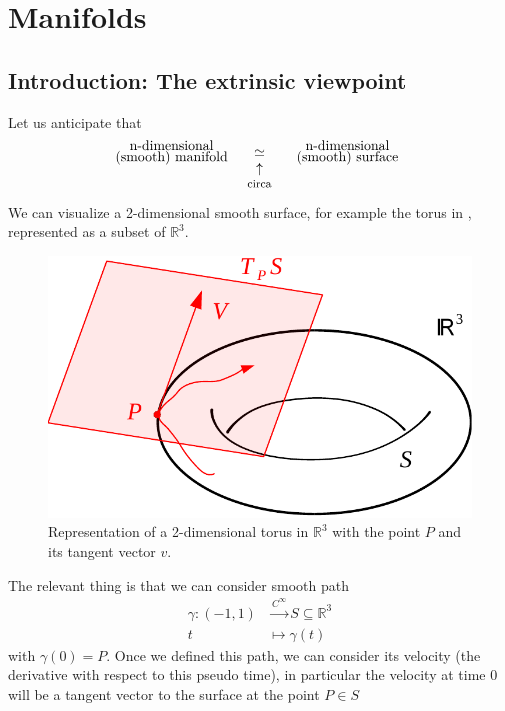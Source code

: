 \documentclass[../main.tex]{subfiles}
\begin{document}
\setchapterpreamble[u]{\margintoc}
\chapter[Manifolds]{Manifolds\footnotemark[0]}
\section[The extrinsic viewpoint]{Introduction: The extrinsic viewpoint}
Let us anticipate that 
\[
\text{\parbox{4 cm}{\centering n-dimensional \\[-4pt]  (smooth) manifold}}\underset{\mathclap{\tikz \node {$\uparrow$} node [below=1ex] {\footnotesize circa};}}{\simeq}\text{\parbox{4 cm}{\centering n-dimensional \\[-4pt]  (smooth) surface}}
\]
We can visualize a 2-dimensional smooth surface, for example the torus in , represented as a subset of $\mathbb{R}^3$. 
\begin{figure}[H]
	\includegraphics[width=1\textwidth]{images/Toro.pdf}
	\caption[Torus]{Representation of a 2-dimensional torus in $\mathbb{R}^3$ with the point $P$ and its tangent vector $v$.}
\end{figure}
The relevant thing is that we can consider smooth path
\[
\begin{split}
\gamma:(-1,1)&\xrightarrow{C^\infty} S\subseteq\mathbb{R}^3\\
t &\mapsto \gamma(t)
\end{split}
\]
with $\gamma(0)=P$. Once we defined this path, we can consider its velocity (the derivative with respect to this pseudo time), in particular the velocity at time $0$ will be a tangent vector to the surface at the point $P\in S$
\end{document}
